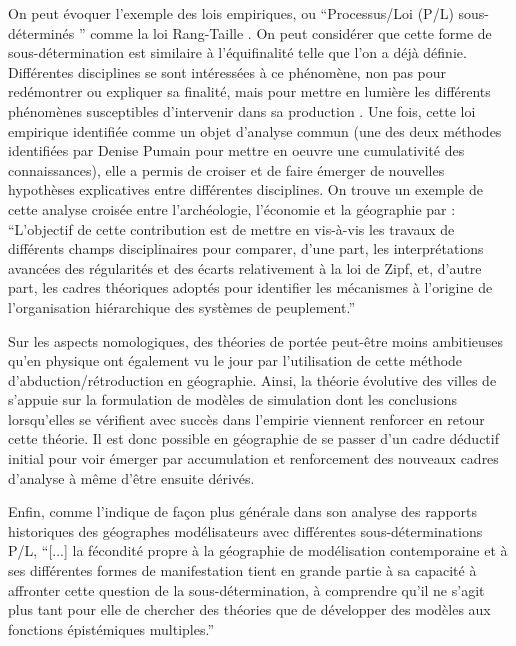 On peut évoquer l'exemple des lois empiriques, ou \enquote{Processus/Loi (P/L) sous-déterminés } comme la loi Rang-Taille \autocite{Varenne2014}. On peut considérer que cette forme de sous-détermination est similaire à l'équifinalité telle que l'on a déjà définie. Différentes disciplines se sont intéressées à ce phénomène, non pas pour redémontrer ou expliquer sa finalité, mais pour mettre en lumière les différents phénomènes susceptibles d'intervenir dans sa production . Une fois, cette loi empirique identifiée comme un objet d'analyse commun (une des deux méthodes identifiées par Denise Pumain pour mettre en oeuvre une cumulativité des connaissances), elle a permis de croiser et de faire émerger de nouvelles hypothèses explicatives entre différentes disciplines. On trouve un exemple de cette analyse croisée entre l'archéologie, l'économie et la géographie par \textcite{Sanders2012} : \enquote{L’objectif de cette contribution est de mettre en vis-à-vis les travaux de différents champs disciplinaires pour comparer, d’une part, les interprétations avancées des régularités et des écarts relativement à la loi de Zipf, et, d’autre part, les cadres théoriques adoptés pour identifier les mécanismes à l’origine de l’organisation hiérarchique des systèmes de peuplement.}

Sur les aspects nomologiques, des théories de portée peut-être moins ambitieuses qu'en physique ont également vu le jour par l'utilisation de cette méthode d'abduction/rétroduction en géographie. Ainsi, la théorie évolutive des villes de \textcite{Pumain1997} s'appuie sur la formulation de modèles de simulation dont les conclusions lorsqu'elles se vérifient avec succès dans l'empirie viennent renforcer en retour cette théorie. Il est donc possible en géographie de se passer d'un cadre déductif initial pour voir émerger par accumulation et renforcement des nouveaux cadres d'analyse à même d'être ensuite dérivés.

Enfin, comme l'indique de façon plus générale \textcite{Varenne2014} dans son analyse des rapports historiques des géographes modélisateurs avec différentes sous-déterminations P/L, \enquote{[...] la fécondité propre à la géographie de modélisation contemporaine et à ses différentes formes de manifestation tient en grande partie à sa capacité à affronter cette question de la sous-détermination, à comprendre qu’il ne s’agit plus tant pour elle de chercher des théories que de développer des modèles aux fonctions épistémiques multiples.}

